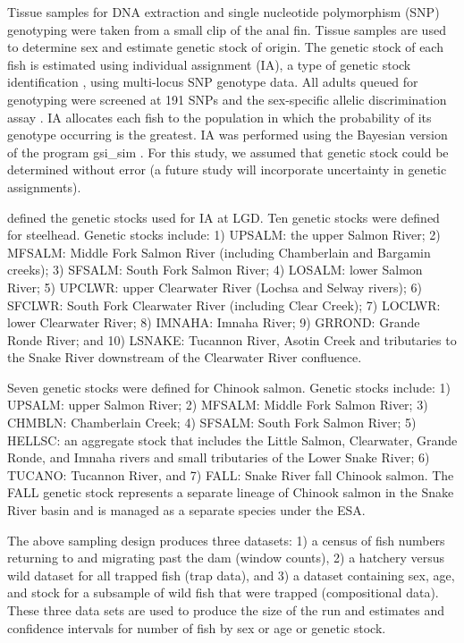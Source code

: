 \documentclass[12pt]{article}
\begin{document}
Tissue samples for DNA extraction and single nucleotide polymorphism (SNP) genotyping were taken from a small clip of the anal fin.  Tissue samples are used to determine sex and estimate genetic stock of origin. The genetic stock of each fish is estimated using individual assignment (IA), a type of genetic stock identification  \cite{Pella1987,Shaklee1999}, using multi-locus SNP genotype data.  All adults queued for genotyping were screened at 191 SNPs and the sex-specific allelic discrimination assay \cite{Campbell2012}. IA allocates each fish to the population in which the probability of its genotype occurring is the greatest. IA was performed using the Bayesian version of the program gsi\_sim \cite{Anderson2008,Anderson2010}.  For this study, we assumed that genetic stock could be determined without error (a future study will incorporate uncertainty in genetic assignments).

 defined the genetic stocks used for IA at LGD. Ten genetic stocks were defined for steelhead. Genetic stocks include: 1) UPSALM: the upper Salmon River; 2) MFSALM: Middle Fork Salmon River (including Chamberlain and Bargamin creeks); 3) SFSALM: South Fork Salmon River; 4) LOSALM: lower Salmon River; 5) UPCLWR: upper Clearwater River (Lochsa and Selway rivers); 6) SFCLWR: South Fork Clearwater River (including Clear Creek); 7) LOCLWR: lower Clearwater River; 8) IMNAHA: Imnaha River; 9) GRROND: Grande Ronde River; and 10) LSNAKE: Tucannon River, Asotin Creek and tributaries to the Snake River downstream of the Clearwater River confluence.

Seven genetic stocks were defined for Chinook salmon. Genetic stocks include: 1) UPSALM: upper Salmon River; 2) MFSALM: Middle Fork Salmon River; 3) CHMBLN: Chamberlain Creek; 4) SFSALM: South Fork Salmon River; 5) HELLSC: an aggregate stock that includes the Little Salmon, Clearwater, Grande Ronde, and Imnaha rivers and small tributaries of the Lower Snake River; 6) TUCANO: Tucannon River, and 7) FALL: Snake River fall Chinook salmon. The FALL genetic stock represents a separate lineage of Chinook salmon in the Snake River basin and is managed as a separate species under the ESA.

The above sampling design produces three datasets: 1) a census of fish numbers returning to and migrating past the dam (window counts), 2) a hatchery versus wild dataset for all trapped fish (trap data), and 3) a dataset containing sex, age, and stock for a subsample of wild fish that were trapped (compositional data). These three data sets are used to produce the size of the run and estimates and confidence intervals for number of fish by sex or age or genetic stock.
\end{document}

